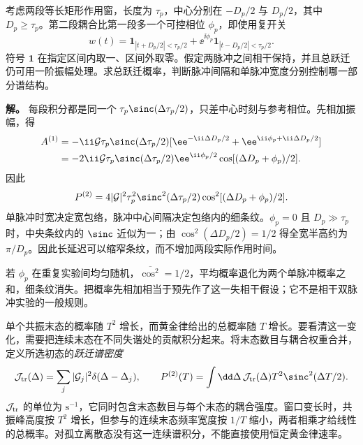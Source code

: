 \begin{exbox}
考虑两段等长矩形作用窗，长度为 $\tau_p$，中心分别在 $-D_p/2$ 与 $D_p/2$，其中 $D_p\ge\tau_p$。第二段耦合比第一段多一个可控相位 $\phi_p$，即使用复开关
\begin{equation*}
 w(t)=\mathbf1_{|t+D_p/2|<\tau_p/2}
       +\ee^{\ii\phi_p}\mathbf1_{|t-D_p/2|<\tau_p/2}.
\end{equation*}
符号 $\mathbf1$ 在指定区间内取一、区间外取零。假定两脉冲之间相干保持，并且总跃迁仍可用一阶振幅处理。求总跃迁概率，判断脉冲间隔和单脉冲宽度分别控制哪一部分谱结构。

\textbf{解。} 每段积分都是同一个 $\tau_p\sinc(\Delta\tau_p/2)$，只差中心时刻与参考相位。先相加振幅，得
\begin{align*}
 A^{(1)}&=-\ii\mathcal G\tau_p\sinc(\Delta\tau_p/2)
 [\ee^{-\ii\Delta D_p/2}+\ee^{\ii\phi_p+\ii\Delta D_p/2}]\\
 &=-2\ii\mathcal G\tau_p\sinc(\Delta\tau_p/2)
 \ee^{\ii\phi_p/2}\cos[(\Delta D_p+\phi_p)/2].
\end{align*}
因此
\begin{equation*}
 P^{(2)}=4|\mathcal G|^2\tau_p^2\sinc^2(\Delta\tau_p/2)
 \cos^2[(\Delta D_p+\phi_p)/2].
\end{equation*}
单脉冲时宽决定宽包络，脉冲中心间隔决定包络内的细条纹。$\phi_p=0$ 且 $D_p\gg\tau_p$ 时，中央条纹内的 $\sinc$ 近似为一；由 $\cos^2(\Delta D_p/2)=1/2$ 得全宽半高约为 $\pi/D_p$。因此长延迟可以缩窄条纹，而不增加两段实际作用时间。

若 $\phi_p$ 在重复实验间均匀随机，$\overline{\cos^2}=1/2$，平均概率退化为两个单脉冲概率之和，细条纹消失。把概率先相加相当于预先作了这一失相干假设；它不是相干双脉冲实验的一般规则。
\end{exbox}

单个共振末态的概率随 $T^2$ 增长，而黄金律给出的总概率随 $T$ 增长。要看清这一变化，需要把连续末态在不同失谐处的贡献积分起来。将末态数目与耦合权重合并，定义所选初态的\emph{跃迁谱密度}
\begin{equation}
 \mathcal J_{\rm tr}(\Delta)=\sum_j|\mathcal G_j|^2\delta(\Delta-\Delta_j),\qquad
 P^{(2)}(T)=\int\dd\Delta\,\mathcal J_{\rm tr}(\Delta)
 T^2\sinc^2(\Delta T/2).
 \label{eq:electron-window-transition-spectrum}
\end{equation}
$\mathcal J_{\rm tr}$ 的单位为 $\mathrm{s^{-1}}$，它同时包含末态数目与每个末态的耦合强度。窗口变长时，共振峰高度按 $T^2$ 增长，但参与的连续末态频率宽度按 $1/T$ 缩小，两者相乘才给线性的总概率。对孤立离散态没有这一连续谱积分，不能直接使用恒定黄金律速率。


